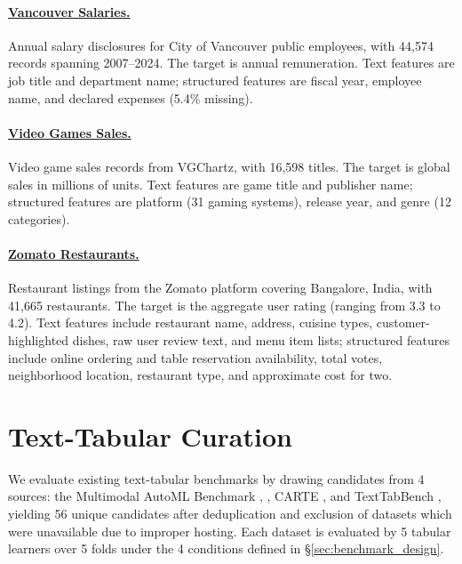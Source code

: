 \paragraph{\href{https://opendata.vancouver.ca}{Vancouver Salaries.}}
Annual salary disclosures for City of Vancouver public employees, with 44,574 records spanning 2007--2024.
The target is annual remuneration.
Text features are job title and department name; structured features are fiscal year, employee name, and declared expenses (5.4\% missing).

\paragraph{\href{https://www.kaggle.com/datasets/gregorut/videogamesales}{Video Games Sales.}}
Video game sales records from VGChartz, with 16,598 titles.
The target is global sales in millions of units.
Text features are game title and publisher name; structured features are platform (31 gaming systems), release year, and genre (12 categories).

\paragraph{\href{https://www.kaggle.com/datasets/himanshupoddar/zomato-bangalore-restaurants}{Zomato Restaurants.}}
Restaurant listings from the Zomato platform covering Bangalore, India, with 41,665 restaurants.
The target is the aggregate user rating (ranging from 3.3 to 4.2).
Text features include restaurant name, address, cuisine types, customer-highlighted dishes, raw user review text, and menu item lists; structured features include online ordering and table reservation availability, total votes, neighborhood location, restaurant type, and approximate cost for two.



\section{Text-Tabular Curation}
\label{app:text_curation}

We evaluate existing text-tabular benchmarks by drawing candidates from 4 sources: the Multimodal AutoML Benchmark \cite{shi_benchmarking_2021}, \citet{grinsztajn_vectorizing_2023}, CARTE \cite{kim_carte_2024}, and TextTabBench \cite{mraz_towards_2025}, yielding 56 unique candidates after deduplication and exclusion of datasets which were unavailable due to improper hosting. Each dataset is evaluated by 5 tabular learners over 5 folds under the 4 conditions defined in \S\ref{sec:benchmark_design}.


